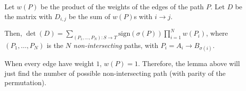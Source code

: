 Let $w(P)$ be the product of the weights of the edges of the path $P$. Let $D$ be the matrix with $D_{i,j}$ be the sum of $w(P)$s with $i \to j$.

Then, $\det(D) = \sum_{(P_1, \ldots, P_N) \colon S \to T} \mathrm{sign}(\sigma(P)) \prod_{i=1}^{N} w(P_i)$, where $(P_1, \ldots, P_N)$ is the $N$ \textit{non-intersecting} paths, with $P_i = A_i \to B_{\sigma(i)}$.

When every edge have weight $1$, $w(P) = 1$. Therefore, the lemma above will just find the number of possible non-intersecting path (with parity of the permutation).